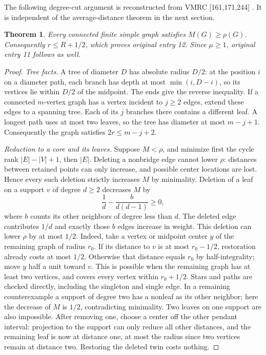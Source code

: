 \documentclass[11pt,a4paper]{article}
\newtheorem{theorem}{Theorem}[section]
\theoremstyle{remark}\newtheorem{remark}[theorem]{Remark}
\begin{document}
The following degree-cut argument is reconstructed from VMRC
[161,171,244] \cite{vmrc161,vmrc171,vmrc244}. It is independent of the
average-distance theorem in the next section.
\begin{theorem}\label{thm:radius}
Every connected finite simple graph satisfies $M(G)\ge\rho(G)$.
Consequently $r\le R+1/2$, which proves original entry 12.
Since $\mu\ge1$, original entry 11 follows as well.
\end{theorem}
\begin{proof}
\emph{Tree facts.} A tree of diameter $D$ has absolute radius $D/2$:
at the position $i$ on a diameter path, each branch has depth at most
$\min(i,D-i)$, so its vertices lie within $D/2$ of the midpoint.
The ends give the reverse inequality. If a connected $m$-vertex graph
has a vertex incident to $j\ge2$ edges, extend these edges to a spanning
tree. Each of its $j$ branches there contains a different leaf. A longest
path uses at most two leaves, so the tree has diameter at most $m-j+1$.
Consequently the graph satisfies $2r\le m-j+2$.

\emph{Reduction to a core and its leaves.} Suppose $M<\rho$, and minimize
first the cycle rank $|E|-|V|+1$, then $|E|$. Deleting a nonbridge
edge cannot lower $\rho$: distances between retained points can only
increase, and possible center locations are lost. Hence every such deletion
strictly increases $M$ by minimality. Deletion of a leaf on a support
$v$ of degree $d\ge2$ decreases $M$ by
\[
 \frac1d-\frac{b}{d(d-1)}\ge0,
\]
where $b$ counts its other neighbors of degree less than $d$.
The deleted edge contributes $1/d$ and exactly those $b$ edges
increase in weight. This deletion can lower $\rho$ by at most $1/2$.
Indeed, take a vertex or midpoint center $y$ of the remaining graph of
radius $r_0$. If its distance to $v$ is at most $r_0-1/2$, restoration
already costs at most $1/2$. Otherwise that distance equals $r_0$
by half-integrality; move $y$ half a unit toward $v$. This is possible
when the remaining graph has at least two vertices, and covers every
vertex within $r_0+1/2$. Stars and paths are checked directly, including
the singleton and single edge. In a remaining counterexample a support
of degree two has a nonleaf as its other neighbor; here the decrease
of $M$ is $1/2$, contradicting minimality. Two leaves on one support
are also impossible. After removing one, choose a center off the other
pendant interval: projection to the support can only reduce all other
distances, and the remaining leaf is now at distance one, at most
the radius since two vertices remain at distance two. Restoring the
deleted twin costs nothing.


\end{proof}
\end{document}
